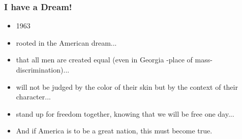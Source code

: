 \documentclass[a5paper,12pt,twoside,titlepage]{scrartcl}
\begin{document}
		\subsubsection{I have a Dream!}
			\begin{itemize}
				\item 1963
				\item rooted in the American dream...
				\item that all men are created equal (even in Georgia -place of mass-discrimination)...
				\item will not be judged by the color of their skin but by the context of their character...
				\item stand up for freedom together, knowing that we will be free one day...
				\item And if America is to be a great nation, this must become true.
			\end{itemize} 
\end{document}

